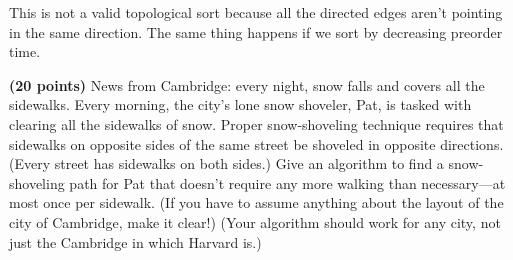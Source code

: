 \documentclass[11pt,letterpaper]{article}
\begin{document}
\begin{solution}
\begin{center}
    \end{center}
    This is not a valid topological sort because all the directed edges aren't pointing in the same direction. The same thing happens if we sort by decreasing preorder time.
    \begin{center}
    \end{center}
\end{solution}

\pagebreak
\begin{problem}
    {\bf (20 points)} News from Cambridge: every night, snow falls and covers all the sidewalks.  Every morning, the city's lone snow shoveler, Pat, is tasked with clearing all the sidewalks of snow. Proper snow-shoveling technique requires that sidewalks on opposite sides of the same street be shoveled in opposite directions.  (Every street has sidewalks on both sides.) Give an algorithm to find a snow-shoveling path for Pat that doesn't require any more walking than necessary---at most once per sidewalk.  (If you have to assume anything about the layout of the city of Cambridge, make it clear!) (Your algorithm should work for any city, not just the Cambridge in which Harvard is.)
\end{problem}
\end{document}
